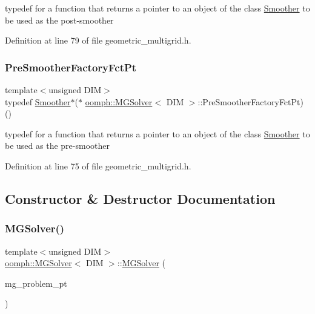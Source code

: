 typedef for a function that returns a pointer to an object of the class \hyperlink{classoomph_1_1Smoother}{Smoother} to be used as the post-\/smoother 



Definition at line 79 of file geometric\+\_\+multigrid.\+h.

\mbox{\label{classoomph_1_1MGSolver_a43de5ad4985ae1bbe68388619a9db32a}} 
\subsubsection{\texorpdfstring{Pre\+Smoother\+Factory\+Fct\+Pt}{PreSmootherFactoryFctPt}}
{\footnotesize\ttfamily template$<$unsigned D\+IM$>$ \\
typedef \hyperlink{classoomph_1_1Smoother}{Smoother}$\ast$($\ast$ \hyperlink{classoomph_1_1MGSolver}{oomph\+::\+M\+G\+Solver}$<$ D\+IM $>$\+::Pre\+Smoother\+Factory\+Fct\+Pt) ()}



typedef for a function that returns a pointer to an object of the class \hyperlink{classoomph_1_1Smoother}{Smoother} to be used as the pre-\/smoother 



Definition at line 75 of file geometric\+\_\+multigrid.\+h.



\subsection{Constructor \& Destructor Documentation}
\mbox{\label{classoomph_1_1MGSolver_a61354743e9989dc8eb69efe2b1414cfa}} 
\subsubsection{\texorpdfstring{M\+G\+Solver()}{MGSolver()}}
{\footnotesize\ttfamily template$<$unsigned D\+IM$>$ \\
\hyperlink{classoomph_1_1MGSolver}{oomph\+::\+M\+G\+Solver}$<$ D\+IM $>$\+::\hyperlink{classoomph_1_1MGSolver}{M\+G\+Solver} (\begin{DoxyParamCaption}\item[{\hyperlink{classoomph_1_1MGProblem}{M\+G\+Problem} $\ast$}]{mg\+\_\+problem\+\_\+pt }\end{DoxyParamCaption})\hspace{0.3cm}{\ttfamily [inline]}}



